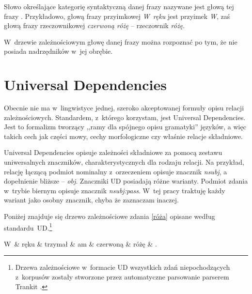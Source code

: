 Słowo określające kategorię syntaktyczną danej frazy nazywane jest głową tej frazy \citep{hoeksema1992head}. Przykładowo, głową frazy przyimkowej \emph{W~ręku} jest przyimek \emph{W}, zaś głową frazy rzeczownikowej \emph{czerwoną różę} -- rzeczownik \emph{różę}. 

W~drzewie zależnościowym głowę danej frazy można rozpoznać po tym, że nie posiada nadrzędników w~jej obrębie.

\section{Universal Dependencies}

Obecnie nie ma w~lingwistyce jednej, szeroko akceptowanej formuły opisu relacji zależnościowych. Standardem, z~którego korzystam, jest Universal Dependencies. Jest to formalizm tworzący ,,ramy dla spójnego opisu gramatyki'' \citep{de2021universal} języków, a więc takich cech jak części mowy, cechy morfologiczne czy właśnie relacje składniowe. 

Universal Dependencies opisuje zależności składniowe za pomocą zestawu uniwersalnych znaczników, charakterystycznych dla rodzaju relacji. Na przykład, relację łączącą podmiot nominalny z~orzeczeniem opisuje znacznik \emph{nsubj}, a dopełnienie bliższe -- \emph{obj}. Znaczniki UD posiadają różne warianty. Podmiot zdania w~trybie biernym opisuje znacznik \emph{nsubj:pass}. W~tej pracy traktuję każdy wariant jako osobny znacznik, chyba że zaznaczam inaczej.

Poniżej znajduje się drzewo zależnościowe zdania \eqref{róża} opisane według standardu~UD.\footnote{Drzewa zależnościowe w~formacie UD wszystkich zdań niepochodzących z~korpusów zostały stworzone przez automatyczne parsowanie parserem Trankit \citep{van2021trankit}.}

\begin{exe}
\ex \label{róża-UD}
\begin{dependency}[baseline=-\the\dimexpr\fontdimen22\textfont2\relax]
\begin{deptext}[column sep=1em]
W~\& ręku \& trzymał \& am \& czerwoną \& różę \& .  \\ 
\end{deptext}
\end{dependency}
\end{exe}

